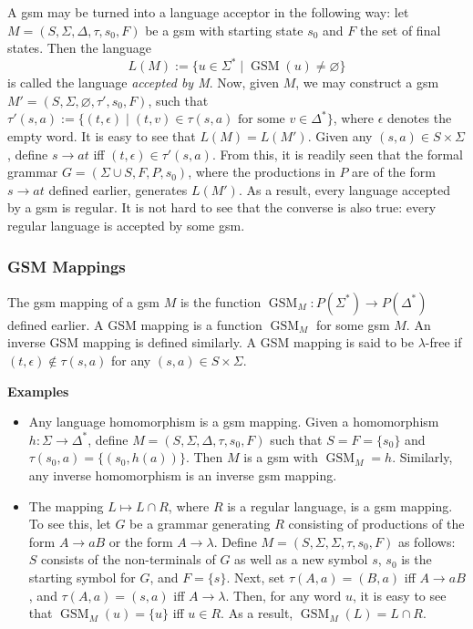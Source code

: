 \documentclass[12pt]{article}
\begin{document}
A gsm may be turned into a language acceptor in the following way: let $M=(S,\Sigma,\Delta,\tau,s_0,F)$ be a gsm with starting state $s_0$ and $F$ the set of final states.  Then the language $$L(M):=\lbrace u\in \Sigma^* \mid \operatorname{GSM}(u)\ne \varnothing \rbrace$$ is called the language \emph{accepted by M}.  Now, given $M$, we may construct a gsm $M'=(S,\Sigma,\varnothing,\tau',s_0,F)$, such that $\tau'(s,a):=\lbrace (t,\epsilon)\mid (t,v)\in \tau(s,a)\mbox{ for some }v\in \Delta^*\rbrace$, where $\epsilon$ denotes the empty word.  It is easy to see that $L(M)=L(M')$.  Given any $(s,a)\in S\times \Sigma$, define $s\to at$ iff $(t,\epsilon)\in \tau'(s,a)$.  From this, it is readily seen that the formal grammar $G=(\Sigma \cup S,F,P,s_0)$, where the productions in $P$ are of the form $s\to at$ defined earlier, generates $L(M')$.  As a result, every language accepted by a gsm is regular.  It is not hard to see that the converse is also true: every regular language is accepted by some gsm.

\subsubsection*{GSM Mappings}

The gsm mapping of a gsm $M$ is the function $\operatorname{GSM}_M: P(\Sigma^*)\to P(\Delta^*)$ defined earlier.  A GSM mapping is a function $\operatorname{GSM}_M$ for some gsm $M$.  An inverse GSM mapping is defined similarly.  A GSM mapping is said to be $\lambda$-free if $(t,\epsilon)\notin \tau(s,a)$ for any $(s,a)\in S\times \Sigma$.  

\textbf{Examples}
\begin{itemize}
\item
Any language homomorphism is a gsm mapping.  Given a homomorphism $h:\Sigma\to \Delta^*$, define $M=(S,\Sigma,\Delta,\tau,s_0,F)$ such that $S=F=\lbrace s_0\rbrace$ and $\tau(s_0,a)=\lbrace (s_0, h(a))\rbrace$.  Then $M$ is a gsm with $\operatorname{GSM}_M=h$.  Similarly, any inverse homomorphism is an inverse gsm mapping.
\item
The mapping $L\mapsto L\cap R$, where $R$ is a regular language, is a gsm mapping.  To see this, let $G$ be a grammar generating $R$ consisting of productions of the form $A\to aB$ or the form $A\to \lambda$.  Define $M=(S,\Sigma,\Sigma,\tau,s_0,F)$ as follows: $S$ consists of the non-terminals of $G$ as well as a new symbol $s$, $s_0$ is the starting symbol for $G$, and $F=\lbrace s\rbrace$.  Next, set $\tau(A,a)=(B,a)$ iff $A\to aB$, and $\tau(A,a)=(s,a)$ iff $A\to \lambda$. Then, for any word $u$, it is easy to see that $\operatorname{GSM}_M(u)=\lbrace u\rbrace$ iff $u \in R$.  As a result, $\operatorname{GSM}_M(L)=L\cap R$.
\end{itemize}
\end{document}
